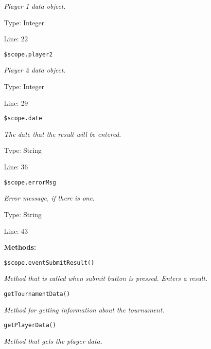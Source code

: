 {\scriptsize
\textit{Player 1 data object.}

Type: Integer

Line: 22

}
\texttt{\$scope.player2}

{\scriptsize
\textit{Player 2 data object.}

Type: Integer

Line: 29

}
\texttt{\$scope.date}

{\scriptsize
\textit{The date that the result will be entered.}

Type: String

Line: 36

}
\texttt{\$scope.errorMsg}

{\scriptsize
\textit{Error message, if there is one.}

Type: String

Line: 43

}
\textbf{Methods:}

\texttt{\$scope.eventSubmitResult()}

{\scriptsize
\textit{Method that is called when submit button is pressed.
Enters a result.}

}

\texttt{getTournamentData()}

{\scriptsize
\textit{Method for getting information about the tournament.}

}

\texttt{getPlayerData()}

{\scriptsize
\textit{Method that gets the player data.}

}

